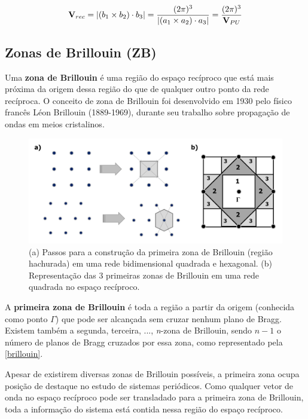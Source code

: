 		\begin{equation}
		\label{eqV}
		\textbf V_{rec} = |(b_{1}\times b_{2})\cdot b_{3}| = \frac{(2\pi)^{3}}{|(a_{1}\times a_{2})\cdot a_{3}|} = \frac{(2\pi)^{3}}{\textbf{V}_{PU}}
		\end{equation}

	\subsection{Zonas de Brillouin (ZB)}
	
		Uma \textbf{zona de Brillouin} é uma região do espaço recíproco que está mais próxima da origem dessa região do que de qualquer outro ponto da rede recíproca. O conceito de zona de Brillouin foi desenvolvido em 1930 pelo físico francês Léon Brillouin (1889-1969), durante seu trabalho sobre propagação de ondas em meios cristalinos.
		
		\begin{figure}[!htb]
			\centering
			\includegraphics[scale=0.4]{capitulos/fig/intro/brillouin}
			\caption{(a) Passos para a construção da primeira zona de Brillouin (região hachurada) em uma rede bidimensional quadrada e hexagonal. (b) Representação das 3 primeiras zonas de Brillouin em uma rede quadrada no espaço recíproco.}
			\label{brillouin}
		\end{figure}

		A \textbf{primeira zona de Brillouin} é toda a região a partir da origem (conhecida como ponto $\Gamma$) que pode ser alcançada sem cruzar nenhum plano de Bragg. Existem também a segunda, terceira, ..., \textit{n}-zona de Brillouin, sendo $n-1$ o número de planos de Bragg cruzados por essa zona, como representado pela \autoref{brillouin}.
		
		Apesar de existirem diversas zonas de Brillouin possíveis, a primeira zona ocupa posição de destaque no estudo de sistemas periódicos. Como qualquer vetor de onda no espaço recíproco pode ser transladado para a primeira zona de Brillouin, toda a informação do sistema está contida nessa região do espaço recíproco. 
		
